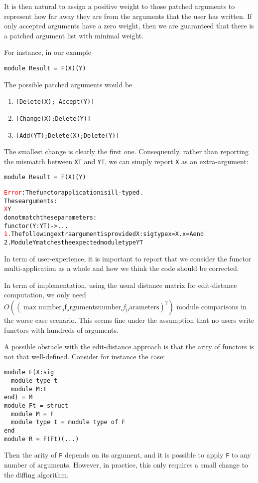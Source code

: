 \documentclass{article}
\newcommand{\error}[1]{\textcolor{red}{#1}}
\newcommand{\ok}[1]{\textcolor{OliveGreen}{#1}}
\begin{document}
It is then natural to assign a positive weight to those patched arguments to represent how far away they
are from the arguments that the user has written.
If only accepted arguments have a zero weight, then we are guaranteed that there is a patched argument list
with minimal weight.

For instance, in our example

\begin{verbatim}
module Result = F(X)(Y)
\end{verbatim}

The possible patched arguments would be

\begin{enumerate}
\item \texttt{[Delete(X); Accept(Y)]}
\item \texttt{[Change(X);Delete(Y)]}
\item \texttt{[Add(YT);Delete(X);Delete(Y)]}
\end{enumerate}

The smallest change is clearly the first one. Consequently, rather than reporting
the mismatch between \texttt{XT} and \texttt{YT}, we can simply report \texttt{X}
as an extra-argument:
\begin{verbatim}
module Result = F(X)(Y)
\end{verbatim}
\begin{alltt}
\error{Error}: The functor application is ill-typed.
       These arguments:
         \error{X} \ok{Y}
       do not match these parameters:
         functor  \ok{(Y : YT)} -> ...
  \error{1.} The following extra argument is provided X : sig type x = X.x = A end
  \ok{2.} Module Y matches the expected module type YT
\end{alltt}

In term of user-experience, it is important to report that we consider the
functor multi-application as a whole and how we think the code should be corrected.

In term of implementation, using the usual distance matrix for edit-distance computation, we only need
$O((\max \mathrm{number_of_arguments} \mathrm{number_of_parameters} )^2)$ module comparisons in the worse case
scenario.
This seems fine under the assumption that no users write functors with hundreds of arguments.

A possible obstacle with the edit-distance approach is that the arity of functors is not that well-defined.
Consider for instance the case:
\begin{verbatim}
module F(X:sig
  module type t
  module M:t
end) = M
module Ft = struct
  module M = F
  module type t = module type of F
end
module R = F(Ft)(...)
\end{verbatim}
Then the arity of \texttt{F} depends on its argument, and it is possible to apply \texttt{F} to
any number of arguments. However, in practice, this only requires a small change to the diffing
algorithm.
\end{document}
